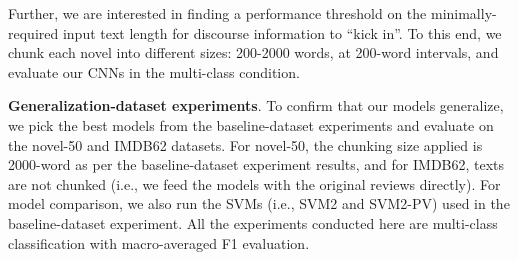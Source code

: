 Further, we are interested in finding a performance threshold on the minimally-required input text length for discourse information to ``kick in''. 
To this end, we chunk each novel into different sizes: 200-2000 words, at 200-word intervals, and evaluate our CNNs in the multi-class condition. 
\medskip

\noindent
\textbf{Generalization-dataset experiments}.
To confirm that our models generalize, we pick the best models from the baseline-dataset experiments and evaluate on the novel-50 and IMDB62 datasets. 
For novel-50, the chunking size applied is 2000-word as per the baseline-dataset experiment results, and for IMDB62, texts are not chunked (i.e., we feed the models with the original reviews directly). 
For model comparison, we also run the SVMs (i.e., SVM2 and SVM2-PV) used in the baseline-dataset experiment.
All the experiments conducted here are multi-class classification with macro-averaged F1 evaluation.
\medskip

\begin{table}[t]
\begin{center}
\caption{Accuracy for pairwise author classification on the novel-9 dataset, using either a dumb baseline, an SVM with and without discourse to replicate F15, or a bigram-character CNN (CNN2) with and without discourse. ($^\ast$ indicates stat. sig. at p$<$0.005 compared to its SVM counterpart).}
\label{tab-num1:exp1}
\end{center}
\end{table}

